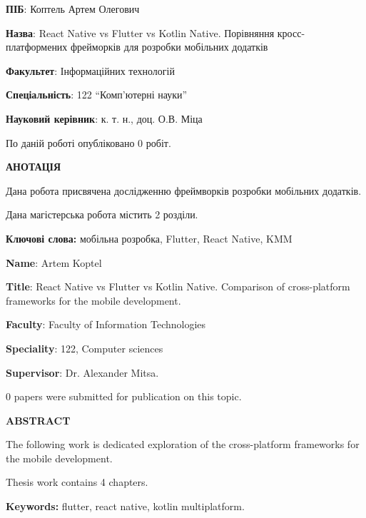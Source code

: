 
\textbf{ПІБ}: Коптель Артем Олегович

\textbf{Назва}: React Native vs Flutter vs Kotlin Native. Порівняння кросс-платформених фрейморків для розробки мобільних додатків

\textbf{Факультет}: Інформаційних технологій

\textbf{Спеціальність}: 122 ``Комп'ютерні науки''

\textbf{Науковий керівник}: к. т. н., доц. О.В. Міца

По даній роботі опубліковано $0$ робіт.

\begin{center}
\textbf{АНОТАЦІЯ}
\end{center}

Дана робота присвячена дослідженню фреймворків розробки мобільних додатків.

Дана магістерська робота містить 2 розділи.

{\bf Ключові слова:} мобільна розробка, Flutter, React Native, KMM

\newpage

\textbf{Name}: Artem Koptel

\textbf{Title}: React Native vs Flutter vs Kotlin Native. Comparison of cross-platform frameworks for the mobile development.

\textbf{Faculty}: Faculty of Information Technologies

\textbf{Speciality}: 122, Computer sciences

\textbf{Supervisor}: Dr. Alexander Mitsa. 

$0$ papers were submitted for publication on this topic.

\begin{center}
\textbf{ABSTRACT}
\end{center}

The following work is dedicated exploration of the cross-platform frameworks for the mobile development.

Thesis work contains 4 chapters.

{\bf Keywords:} flutter, react native, kotlin multiplatform.

